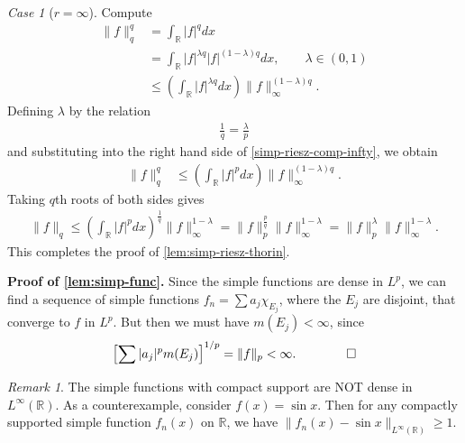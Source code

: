 \documentclass[12pt,reqno]{amsart}
\numberwithin{equation}{section}  %
\numberwithin{figure}{section}
\newcommand{\rr}{\mathbb{R}}
\theoremstyle{plain}
\theoremstyle{definition}
\theoremstyle{remark}
\newtheorem{remark}{Remark}
\newtheorem{case}{Case}
\begin{document}
\begin{case}[$r = \infty$]
Compute
%
\begin{equation}
	\label{simp-riesz-comp-infty}
	\begin{split}
		\| f \|_{q}^{q}
		& = \int_{\rr} | f |^{q}dx
		\\
		& = \int_{\rr} | f |^{\lambda q} | f |^{(1-\lambda)q} dx, \qquad \lambda \in
		(0,1)
		\\
		& \le \left( \int_{\rr} | f |^{\lambda q} dx \right)
		\| f \|_{\infty}^{(1 - \lambda)q} .
	\end{split}
\end{equation}
Defining $\lambda$ by the relation
%
%
\begin{equation*}
	\begin{split}
		\frac{1}{q} = \frac{\lambda}{p}
	\end{split}
\end{equation*}
and substituting into the right hand side of \eqref{simp-riesz-comp-infty}, we obtain
%
%
\begin{equation*}
	\begin{split}
		\| f \|_{q}^{q}
		& \le \left( \int_{\rr} | f |^{p} dx \right) \|f \|_{\infty}^{(1 -
		\lambda)q}.
	\end{split}
\end{equation*}
%
%
Taking $q$th roots of both sides gives
%
%
\begin{equation*}
	\begin{split}
		\|f\|_{q} \le \left( \int_{\rr} | f |^{p} dx \right)^{\frac{1}{q}}
		\|f \|_{\infty}^{1 -\lambda} = \|f\|_{p}^{\frac{p}{q}}
		\|f\|_{\infty}^{1 - \lambda} = \|f\|_{p}^{\lambda} \|f\|_{\infty}^{1-
		\lambda}.
	\end{split}
\end{equation*}
%
%
This completes the proof of \autoref{lem:simp-riesz-thorin}.	\qquad \qedsymbol		
\end{case}
%
%
{\bf Proof of \autoref{lem:simp-func}.}
Since the simple functions are dense in $L^p$, we can find a sequence of simple
functions $f_n=\sum a_{j} \chi_{E_j}$, where the $E_j$ are disjoint, that
converge to $f$ in $L^p$. But then we must have $m(E_j) < \infty$, since
%
%
\begin{equation*}
\begin{split}
	\left[ \sum | a_j |^{p} m(E_j) \right]^{1/p} =  \|f\|_{p} < \infty. \qquad
	\qed
\end{split}
\end{equation*}
%
%
%
%
\begin{framed}
\begin{remark}
	\label{rem:density}
	The simple functions with compact support are NOT dense in $L^\infty(\rr)$. As a
	counterexample, consider $f(x) = \sin x$. Then for any compactly supported simple
	function $f_n(x)$ on $\rr$, we have $\| f_n(x) - \sin x \|_{L^\infty(\rr)} \ge 1$.
\end{remark}
\end{framed}
\end{document}

